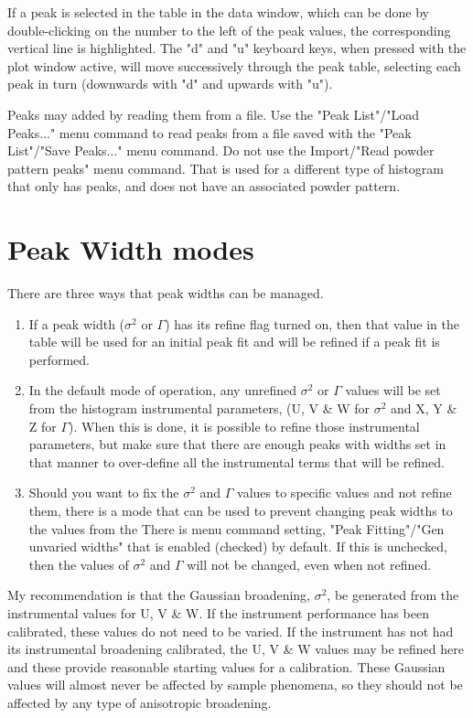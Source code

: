 If a peak is selected in the table in the data window, which can be done by double-clicking on the number to the left of the peak values, the corresponding vertical line is highlighted. The "d" and "u" keyboard keys, when pressed with the plot window active, will  move successively through the peak table, selecting each peak in turn (downwards with "d" and upwards with "u").  

Peaks may added by reading them from a file. Use the "Peak List"/"Load Peaks..." menu command to read peaks from a file saved with the "Peak List"/"Save Peaks..." menu command. Do not use the  Import/"Read powder pattern peaks" menu command. That is used for a different type of histogram that only has peaks, and does not have an associated powder pattern. 

\section{Peak Width modes}\label{ref:widthmode}
There are three ways that peak widths can be managed. 
\begin{enumerate}
    \item If a peak width ($\sigma^2$ or $\Gamma$) has its refine flag turned on, then that value in the table will be used for an initial peak fit and will be refined if a peak fit is performed. 
    \item In the default mode of operation, any unrefined $\sigma^2$ or $\Gamma$ values will be set from the histogram instrumental parameters, (U, V \& W for $\sigma^2$ and X, Y \& Z for $\Gamma$). When this is done, it is possible to refine those instrumental parameters, but make sure that there are enough peaks with widths set in that manner to over-define all the instrumental terms that will be refined.
    \item Should you want to fix the $\sigma^2$ and $\Gamma$ values to specific values and not refine them, there is a mode that can be used to prevent changing peak widths to the values from the There is menu command setting,  "Peak Fitting"/"Gen unvaried widths" that is enabled (checked) by default. If this is unchecked, then the values of $\sigma^2$ and $\Gamma$ will not be changed, even when not refined. 
\end{enumerate}

My recommendation is that the Gaussian broadening,  $\sigma^2$, be generated from the instrumental values for U, V \& W. If the instrument performance has been calibrated, these values do not need to be varied. If the instrument has not had its instrumental broadening calibrated, the U, V \& W values may be refined here and these provide reasonable starting values for a calibration.  These Gaussian values will almost never be affected by sample phenomena, so they should not be affected by any type of anisotropic broadening. 

